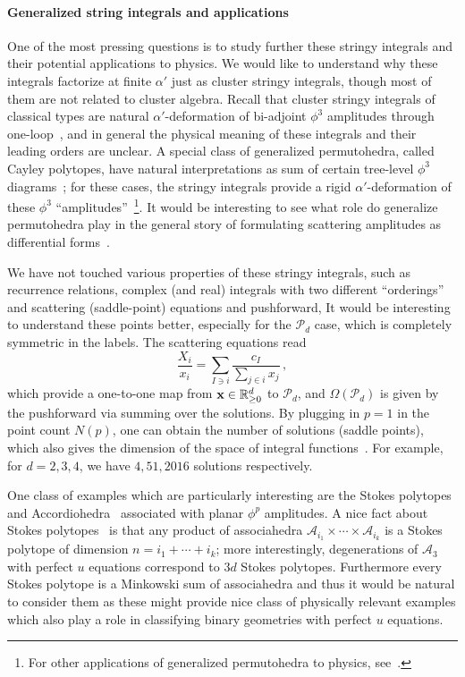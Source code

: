 \documentclass[hidelinks,12pt]{article}
\begin{document}
\paragraph{Generalized string integrals and applications} One of the most pressing questions is to study further these stringy integrals and their potential applications to physics. We would like to understand why these integrals factorize at finite $\alpha'$ just as cluster stringy integrals, though most of them are not related to cluster algebra. Recall that cluster stringy integrals of classical types are natural $\alpha'$-deformation of bi-adjoint $\phi^3$ amplitudes through one-loop~\cite{Arkani-Hamed:2019vag}, and in general the physical meaning of these integrals and their leading orders are unclear. A special class of generalized permutohedra, called Cayley polytopes, have natural interpretations as sum of certain tree-level $\phi^3$ diagrams~\cite{Gao:2017dek,He:2018pue}; for these cases, the stringy integrals provide a rigid $\alpha'$-deformation of these $\phi^3$ ``amplitudes''~\footnote{For other applications of generalized permutohedra to physics, see~\cite{early2017generalized,Early:2018zuw}.}. It would be interesting to see what role do generalize permutohedra play in the general story of formulating scattering amplitudes as differential forms~\cite{Arkani-Hamed:2017tmz, He:2018okq, Arkani-Hamed:2017mur, Arkani-Hamed:2019vag}.

We have not touched various properties of these stringy integrals, such as recurrence relations, complex (and real) integrals with two different ``orderings'' and scattering (saddle-point) equations and pushforward, It would be interesting to understand these points better, especially for the ${\mathscr P}_d$ case, which is completely symmetric in the labels. The scattering equations read
\[\frac{X_i}{x_i}=\sum_{I \ni i} \frac{c_I}{\sum_{j \in i} x_j}\,,
\]
which provide a one-to-one map from ${\bf x}\in \mathbb{R}_{\geq 0}^d$ to ${\mathscr P}_d$, and $\Omega({\mathscr P}_d)$ is given by the pushforward via summing over the solutions. By plugging in $p=1$ in the point count $N(p)$, one can obtain the number of solutions (saddle points), which also gives the dimension of the space of integral functions~\cite{Arkani-Hamed:2019mrd}. For example, for $d=2, 3, 4$, we have $4, 51, 2016$ solutions respectively. 

One class of examples which are particularly interesting are the Stokes polytopes and Accordiohedra~\cite{Banerjee:2018tun,Raman:2019utu} associated with planar $\phi^{p}$ amplitudes. A nice fact about Stokes polytopes~\cite{Chapoton, Raman:2019utu} is that any product of associahedra ${\mathscr A}_{i_1}\times \cdots \times {\mathscr A}_{i_k}$ is a Stokes polytope of dimension $n=i_1+\cdots+i_k$; more interestingly, degenerations of ${\mathscr A_3}$ with perfect $u$ equations correspond to $3d$ Stokes polytopes. Furthermore every Stokes polytope is a Minkowski sum of associahedra \cite{Baryshnikov} and thus it would be natural to consider them as these might provide nice class of physically relevant examples which also play a role in classifying binary geometries with perfect $u$ equations.
\end{document}
